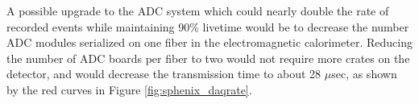 A possible upgrade to the ADC system which could nearly double
the rate of recorded events while maintaining 90\% livetime would be to decrease the number ADC modules serialized on one fiber in the electromagnetic calorimeter.
Reducing the number of ADC boards per fiber to two would not require more crates on the detector, and would decrease the transmission time to about 28 $\mu$sec, as 
shown by the red curves in Figure \ref{fig:sphenix_daqrate}.



